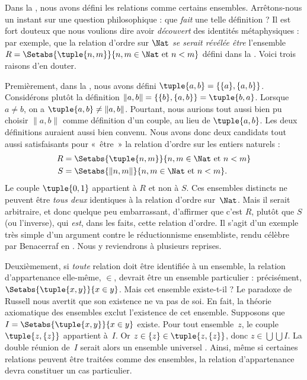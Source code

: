 \documentclass[../../../include/open-logic-section]{subfiles}
\begin{document}

Dans la , nous avons défini les relations comme
certains ensembles. Arrêtons-nous un instant sur une question
philosophique : que \emph{fait} une telle définition ?
Il est fort douteux que nous voulions dire avoir
\emph{découvert} des identités métaphysiques : par exemple,
que la relation d'ordre sur $\Nat$ \emph{se serait révélée être}
l'ensemble $R= \Setabs{\tuple{n,m}}{n, m \in \Nat\text{ et }
n < m}$ défini dans la .
Voici trois raisons d'en douter.

Premièrement, dans la ,
nous avons défini $\tuple{a, b} = \{\{a\}, \{a, b\}\}$.
Considérons plutôt la définition
$\lVert a, b\rVert = \{\{b\}, \{a, b\}\} = \tuple{b,a}$.
Lorsque $a \neq b$, on a
$\tuple{a, b} \neq \lVert a,b\rVert$.
Pourtant, nous aurions tout aussi bien pu choisir
$\lVert a,b\rVert$ comme définition d'un couple, au lieu de
$\tuple{a,b}$. Les deux définitions auraient aussi bien convenu.
Nous avons donc deux candidats tout aussi satisfaisants
pour «~être~» la relation d'ordre sur les entiers naturels :
\begin{align*}
		R &= \Setabs{\tuple{n,m}}{n, m \in \Nat \text{ et }n < m}\\
		S &= \Setabs{\lVert n,m\rVert}{n, m \in \Nat \text{ et }n < m}.
\end{align*}
Le couple $\tuple{0,1}$ appartient à $R$ et non à $S$.
Ces ensembles distincts ne peuvent être \emph{tous deux} identiques à
la relation d'ordre sur~$\Nat$. Mais il serait arbitraire, et donc quelque
peu embarrassant, d'affirmer que c'est $R$, plutôt que $S$
(ou l'inverse), qui \emph{est}, dans les faits, cette relation
d'ordre. Il s'agit d'un exemple très simple d'un argument
contre le réductionnisme ensembliste, rendu célèbre par
Benacerraf en \citeyear{Benacerraf1965}.
Nous y reviendrons à plusieurs reprises.

Deuxièmement, si \emph{toute} relation doit être identifiée
à un ensemble, la relation d'appartenance elle-même, $\in$,
devrait être un ensemble particulier : précisément,
$\Setabs{\tuple{x,y}}{x \in y}$.
Mais cet ensemble existe-t-il ?
Le paradoxe de Russell nous avertit que son existence
ne va pas de soi. En fait, la théorie axiomatique des ensembles%
exclut l'existence de cet ensemble. Supposons que
$I = \Setabs{\tuple{x,y}}{x \in y}$ existe.
Pour tout ensemble~$z$, le couple $\tuple{z,\{z\}}$ appartient
à~$I$. Or $z\in\{z\}\in\tuple{z,\{z\}}$, donc $z\in\bigcup\bigcup I$.
La double réunion de~$I$ serait alors un ensemble universel%
.
%
%
Ainsi, même si certaines relations peuvent être traitées
comme des ensembles, la relation d'appartenance devra
constituer un cas particulier.
\end{document}
